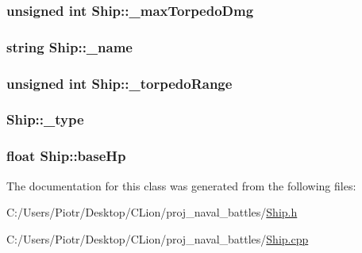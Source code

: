 \subsubsection[{\texorpdfstring{\+\_\+max\+Torpedo\+Dmg}{_maxTorpedoDmg}}]{\setlength{\rightskip}{0pt plus 5cm}unsigned int Ship\+::\+\_\+max\+Torpedo\+Dmg\hspace{0.3cm}{\ttfamily [protected]}}\hypertarget{class_ship_adc1f7e5d7b3db9420ce78c81ba7d64f1}{}\label{class_ship_adc1f7e5d7b3db9420ce78c81ba7d64f1}
\subsubsection[{\texorpdfstring{\+\_\+name}{_name}}]{\setlength{\rightskip}{0pt plus 5cm}string Ship\+::\+\_\+name\hspace{0.3cm}{\ttfamily [protected]}}\hypertarget{class_ship_a68cf161799aadcbbe1c7b28b9dd10849}{}\label{class_ship_a68cf161799aadcbbe1c7b28b9dd10849}
\subsubsection[{\texorpdfstring{\+\_\+torpedo\+Range}{_torpedoRange}}]{\setlength{\rightskip}{0pt plus 5cm}unsigned int Ship\+::\+\_\+torpedo\+Range\hspace{0.3cm}{\ttfamily [protected]}}\hypertarget{class_ship_af3e30d448490de75365944a9b8715445}{}\label{class_ship_af3e30d448490de75365944a9b8715445}
\subsubsection[{\texorpdfstring{\+\_\+type}{_type}}]{ Ship\+::\+\_\+type\hspace{0.3cm}{\ttfamily [protected]}}\hypertarget{class_ship_a5a32460ba76649a09aa9c9d4df332217}{}\label{class_ship_a5a32460ba76649a09aa9c9d4df332217}
\subsubsection[{\texorpdfstring{base\+Hp}{baseHp}}]{\setlength{\rightskip}{0pt plus 5cm}float Ship\+::base\+Hp\hspace{0.3cm}{\ttfamily [protected]}}\hypertarget{class_ship_af95a5ee3b4f3ffc4ab069a5dce7baa16}{}\label{class_ship_af95a5ee3b4f3ffc4ab069a5dce7baa16}


The documentation for this class was generated from the following files\+:\begin{DoxyCompactItemize}
\item 
C\+:/\+Users/\+Piotr/\+Desktop/\+C\+Lion/proj\+\_\+naval\+\_\+battles/\hyperlink{_ship_8h}{Ship.\+h}\item 
C\+:/\+Users/\+Piotr/\+Desktop/\+C\+Lion/proj\+\_\+naval\+\_\+battles/\hyperlink{_ship_8cpp}{Ship.\+cpp}\end{DoxyCompactItemize}
